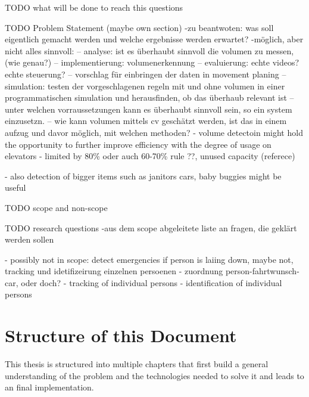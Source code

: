 TODO what will be done to reach this questions





TODO Problem Statement (maybe own section)
-zu beantwoten: was soll eigentlich gemacht werden und welche ergebnisse werden erwartet?
-möglich, aber nicht alles sinnvoll: 
-- analyse: ist es überhaubt sinnvoll die volumen zu messen, (wie genau?)
-- implementierung: volumenerkennung
-- evaluierung: echte videos? echte steuerung?
-- vorschlag für einbringen der daten in movement planing
-- simulation: testen der vorgeschlagenen regeln mit und ohne volumen in einer programmatischen simulation und herausfinden, ob das überhaub relevant ist
-- unter welchen vorraussetzungen kann es überhaubt sinnvoll sein, so ein system einzusetzn.
-- wie kann volumen mittels cv geschätzt werden, ist das in einem aufzug und davor möglich, mit welchen methoden?
- volume detectoin might hold the opportunity to further improve efficiency with the degree of usage on elevators
- limited by 80\% oder auch 60-70\% rule \autocite[][p.~194]{unger2015aufzuege} ??, unused capacity (referece)
 
- also detection of bigger items such as janitors cars, baby buggies  might be useful

TODO scope and non-scope

TODO research questions
-aus dem scope abgeleitete liste an fragen, die geklärt werden sollen

- possibly not in scope: detect emergencies if person is laiing down, maybe not, tracking und idetifizeirung einzelnen persoenen
- zuordnung person-fahrtwunsch-car, oder doch?
- tracking of individual persons
- identification of individual persons


\section{Structure of this Document}

This thesis is structured into multiple chapters that first build a general understanding of the problem and the technologies needed to solve it and leads to an final implementation.

